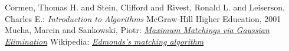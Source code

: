 \documentclass{llncs}
\begin{document}
%
%
\begin{thebibliography}{4}
%
Cormen, Thomas H. and Stein, Clifford and Rivest, Ronald L. and Leiserson, Charles E.:
\textsl{Introduction to Algorithms}
McGraw-Hill Higher Education, 2001
Mucha, Marcin and Sankowski, Piotr:
\textsl{\href{http://www.mimuw.edu.pl/~mucha/pub/mucha_sankowski_focs04.pdf}{Maximum Matchings via Gaussian Elimination}}
Wikipedia:
\textsl{\href{http://en.wikipedia.org/wiki/Blossom_algorithm}{Edmonds's matching algorithm}}
\end{thebibliography}
\end{document}
